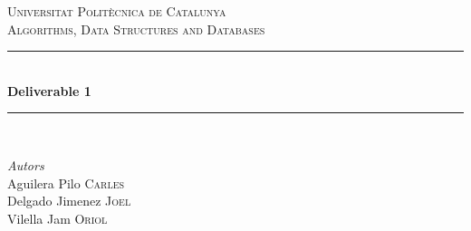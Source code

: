 \documentclass[12pt]{article}
\begin{document}
\begin{titlepage}

\newcommand{\HRule}{\rule{\linewidth}{0.5mm}} %

\center %
 

\textsc{\LARGE Universitat Politècnica de Catalunya}\\[1.5cm] %
\textsc{\Large Algorithms, Data Structures and Databases}\\[0.5cm] %


\HRule \\[0.4cm]
{ \huge \bfseries Deliverable 1}\\[0.4cm] %
\HRule \\[1.0cm]
 

\begin{minipage}{0.53\textwidth}
\large
\centering
\emph{Autors}\\
Aguilera Pilo \textsc{Carles}\\
Delgado Jimenez \textsc{Joel}\\
Vilella Jam \textsc{Oriol}\\
\end{minipage}
~
\begin{minipage}{0.4\textwidth}
\end{minipage}\\[2cm]




\end{titlepage}
\end{document}
